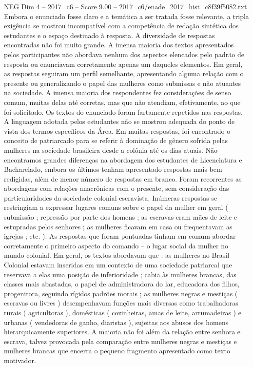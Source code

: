 \begin{textsample}{NEG Dim 4 – 2017\_c6 – Score 9.00 – 2017\_c6/enade\_2017\_hist\_c8f39f5082.txt}
Embora o enunciado fosse claro e a temática a ser tratada fosse relevante, a tripla exigência se mostrou incompatível com a competência de redação sintética dos estudantes e o espaço destinado à resposta.
A diversidade de respostas encontradas não foi muito grande.
A imensa maioria dos textos apresentados pelos participantes não abordava nenhum dos aspectos elencados pelo padrão de resposta ou enunciavam corretamente apenas um daqueles elementos.
Em geral, as respostas seguiram um perfil semelhante, apresentando alguma relação com o presente ou generalizando o papel das mulheres como submissas e não atuantes na sociedade.
A imensa maioria dos respondentes fez considerações de senso comum, muitas delas até corretas, mas que não atendiam, efetivamente, ao que foi solicitado.
Os textos do enunciado foram fartamente repetidos nas respostas.
A linguagem adotada pelos estudantes não se mostrou adequada do ponto de vista dos termos específicos da Área.
Em muitas respostas, foi encontrado o conceito de patriarcado para se referir à dominação de gênero sofrida pelas mulheres na sociedade brasileira desde a colônia até os dias atuais.
Não encontramos grandes diferenças na abordagem dos estudantes de Licenciatura e Bacharelado, embora os últimos tenham apresentado respostas mais bem redigidas, além de menor número de respostas em branco.
Foram recorrentes as abordagens com relações anacrônicas com o presente, sem consideração das particularidades da sociedade colonial escravista.
Inúmeras respostas se restringiam a expressar lugares comuns sobre o papel da mulher em geral ( submissão ; repressão por parte dos homens ; as escravas eram mães de leite e estupradas pelos senhores ; as mulheres ficavam em casa ou frequentavam as igrejas ; etc. ).
As respostas que foram pontuadas tinham em comum abordar corretamente o primeiro aspecto do comando – o lugar social da mulher no mundo colonial.
Em geral, os textos abordavam que : as mulheres no Brasil Colonial estavam inseridas em um contexto de uma sociedade patriarcal que reservava a elas uma posição de inferioridade ; cabia às mulheres brancas, das classes mais abastadas, o papel de administradora do lar, educadora dos filhos, progenitora, seguindo rígidos padrões morais ; as mulheres negras e mestiças ( escravas ou livres ) desempenhavam funções mais diversas como trabalhadoras rurais ( agricultoras ), domésticas ( cozinheiras, amas de leite, arrumadeiras ) e urbanas ( vendedoras de ganho, diaristas ), sujeitas aos abusos dos homens hierarquicamente superiores.
A maioria não foi além da relação entre senhora e escrava, talvez provocada pela comparação entre mulheres negras e mestiças e mulheres brancas que encerra o pequeno fragmento apresentado como texto motivador.

\end{textsample}
